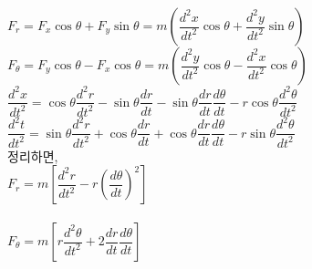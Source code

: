 \documentclass[11pt]{beamer}
\begin{document}
\begin{frame}{1.3}\footnotesize

	$ F_{r} = F_{x} \cos \theta + F_{y} \sin \theta 
	= m \left ( \dfrac{d^{2}x}{dt^{2}} \cos \theta + \dfrac{d^{2}y}{dt^{2}} \sin \theta \right) $\\
	
	$ F_{\theta} = F_{y} \cos \theta - F_{x} \cos \theta 
	= m \left ( \dfrac{d^{2}y}{dt^{2}} \cos \theta - \dfrac{d^{2}x}{dt^{2}} \cos \theta \right) $\\
	
	$\dfrac{d^{2}x}{dt^{2}} = \cos \theta \dfrac{d^{2}r}{dt^{2}} - \sin \theta \dfrac{dr}{dt} - \sin \theta \dfrac{dr}{dt} \dfrac{d\theta}{dt} -r \cos \theta \dfrac{d^{2}\theta}{dt^{2}}$\\
	
	$\dfrac{d^{2}t}{dt^{2}} = \sin \theta \dfrac{d^{2}r}{dt^{2}} + \cos \theta \dfrac{dr}{dt} + \cos \theta \dfrac{dr}{dt} \dfrac{d\theta}{dt} -r \sin \theta \dfrac{d^{2}\theta}{dt^{2}}$\\
	
	
	정리하면, \\
	
	$ F_{r} = m \left[ \dfrac{d^{2}r}{dt^{2}} - r \left( {\dfrac{d \theta}{dt}} \right)^{2} \right] $\\
	\\
	$ F_{\theta} = m \left[ r \dfrac{d^{2}\theta}{dt^{2}} + 2 \dfrac{dr}{dt} \dfrac{d\theta}{dt}  \right] $\\

\end{frame}


\end{document}
